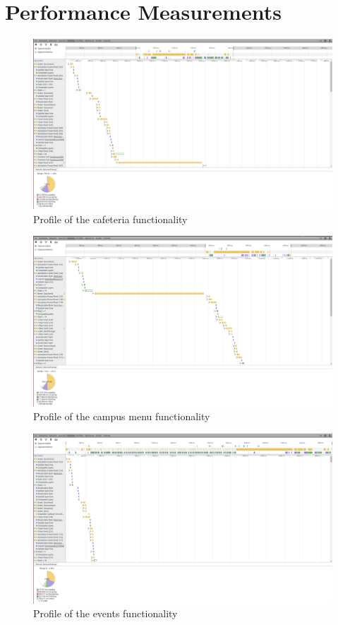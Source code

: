 \documentclass{eplmastersthesis}
\begin{document}
\chapter{Performance Measurements}
\begin{figure}[H]
\centering
\includegraphics[scale = 0.15]{Images/cafetaria.png}
\caption{Profile of the cafeteria functionality}
\end{figure}
\begin{figure}[H]
\centering
\includegraphics[scale = 0.15]{Images/campus.png}
\caption{Profile of the campus menu functionality}
\end{figure}
\begin{figure}[H]
\centering
\includegraphics[scale = 0.15]{Images/events.png}
\caption{Profile of the events functionality}
\end{figure}
\end{document}
